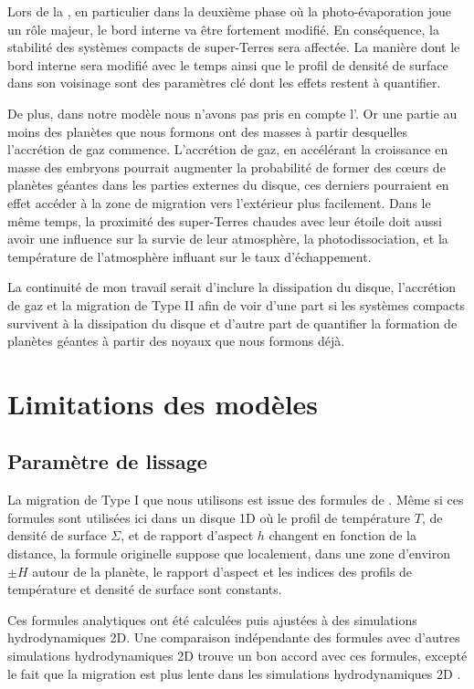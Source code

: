 \bigskip

Lors de la , en particulier dans la deuxième phase où la photo-évaporation joue un rôle majeur, le bord interne va être fortement modifié. En conséquence, la stabilité des systèmes compacts de super-Terres sera affectée. La manière dont le bord interne sera modifié avec le temps ainsi que le profil de densité de surface dans son voisinage sont des paramètres clé dont les effets restent à quantifier. 

De plus, dans notre modèle nous n'avons pas pris en compte l'. Or une partie au moins des planètes que nous
formons ont des masses à partir desquelles l'accrétion de gaz commence. L'accrétion de gaz, en accélérant la croissance en
masse des embryons pourrait augmenter la probabilité de former des cœurs de planètes géantes dans les parties externes du
disque, ces derniers pourraient en effet accéder à la zone de migration vers l'extérieur plus facilement. Dans le même temps, la
proximité des super-Terres chaudes avec leur étoile doit aussi avoir une influence sur la survie de leur atmosphère, la photodissociation, et la température de l'atmosphère influant sur le taux d'échappement. 

La continuité de mon travail serait d'inclure la dissipation du disque, l'accrétion de gaz et la migration de Type II afin de
voir d'une part si les systèmes compacts survivent à la dissipation du disque et d'autre part de quantifier la formation de
planètes géantes à partir des noyaux que nous formons déjà.

\section{Limitations des modèles}
\subsection{Paramètre de lissage}
La migration de Type I que nous utilisons est issue des formules de \cite{paardekooper2011torque}. Même si ces formules sont
utilisées ici dans un disque 1D où le profil de température $T$, de densité de surface $\Sigma$, et de rapport d'aspect $h$
changent en fonction de la distance, la formule originelle suppose que localement, dans une zone d'environ $\pm H$ autour de la
planète, le rapport d'aspect et les indices des profils de température et densité de surface sont constants. 

Ces formules analytiques ont été calculées puis ajustées à des simulations hydrodynamiques 2D. Une comparaison indépendante des formules avec d'autres simulations hydrodynamiques 2D trouve un bon accord avec ces formules, excepté le fait que la migration est plus lente dans les simulations hydrodynamiques 2D \citep{pierens2013makingaccepted}. 


